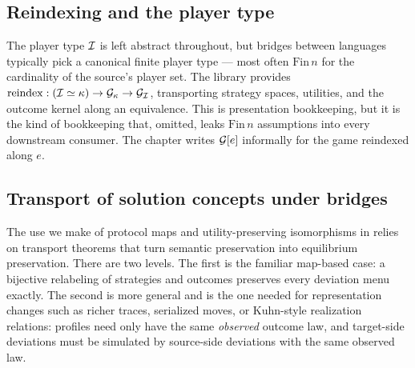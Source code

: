
\subsection{Reindexing and the player type}
\label{sec:semantic-core:reindex}

The player type $\mathcal{I}$ is left abstract throughout, but
bridges between languages typically pick a canonical finite
player type — most often $\mathrm{Fin}\,n$ for the cardinality of
the source's player set.  The library provides
$\mathrm{reindex} : (\mathcal{I} \simeq \kappa) \to \mathcal{G}_\kappa \to
\mathcal{G}_{\mathcal{I}}$, transporting strategy spaces, utilities, and the
outcome kernel along an equivalence.  This is presentation
bookkeeping, but it is the kind of bookkeeping that, omitted, leaks
$\mathrm{Fin}\,n$ assumptions into every downstream consumer.  The
chapter writes $\mathcal{G}[e]$ informally for the game reindexed along
$e$.

\subsection{Transport of solution concepts under bridges}
\label{sec:semantic-core:transport}

The use we make of protocol maps and utility-preserving isomorphisms in
 relies on transport theorems that
turn semantic preservation into equilibrium preservation.  There
are two levels.  The first is the familiar map-based case: a
bijective relabeling of strategies and outcomes preserves every
deviation menu exactly.  The second is more general and is the one
needed for representation changes such as richer traces, serialized
moves, or Kuhn-style realization relations: profiles need only have
the same \emph{observed} outcome law, and target-side deviations
must be simulated by source-side deviations with the same observed
law.

